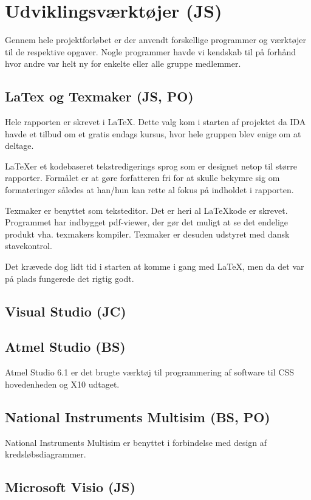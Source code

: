 \chapter{Udviklingsværktøjer (JS)}
Gennem hele projektforløbet er der anvendt forskellige programmer og værktøjer til de respektive opgaver. Nogle programmer havde vi kendskab til på forhånd hvor andre var helt ny for enkelte eller alle gruppe medlemmer.

\section{LaTex og Texmaker (JS, PO)}
Hele rapporten er skrevet i \LaTeX. Dette valg kom i starten af projektet da IDA havde et tilbud om et gratis endags kursus, hvor hele gruppen blev enige om at deltage. 

\LaTeX er et kodebaseret tekstredigerings sprog som er designet netop til større rapporter. Formålet er at gøre forfatteren fri for at skulle bekymre sig om formateringer således at han/hun kan rette al fokus på indholdet i rapporten.

Texmaker er benyttet som teksteditor. Det er heri al \LaTeX kode er skrevet. Programmet har indbygget pdf-viewer, der gør det muligt at se det endelige produkt vha. texmakers kompiler. Texmaker er desuden udstyret med dansk stavekontrol.

Det krævede dog lidt tid i starten at komme i gang med \LaTeX, men da det var på plads fungerede det rigtig godt. 

\section{Visual Studio (JC)}

\section{Atmel Studio (BS)}
Atmel Studio 6.1 er det brugte værktøj til programmering af software til CSS hovedenheden og X10 udtaget.

\section{National Instruments Multisim (BS, PO)}
National Instruments Multisim er benyttet i forbindelse med design af kredsløbsdiagrammer. 

\section{Microsoft Visio (JS)} %

